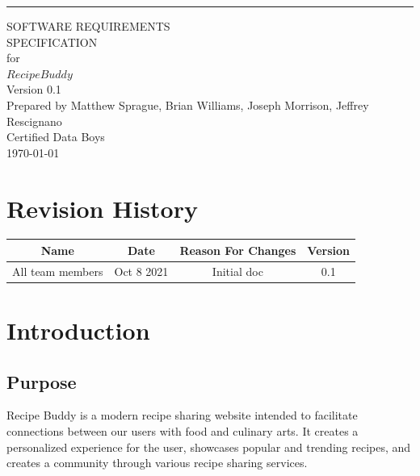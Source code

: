 \documentclass{scrreprt}
\def\myversion{0.1}
\begin{document}
\begin{flushright}
    \rule{16cm}{5pt}\vskip1cm
    \begin{bfseries}
        \Huge{SOFTWARE REQUIREMENTS\\ SPECIFICATION}\\
        \vspace{1.85cm}
        for\\
        \vspace{1.85cm}
        $Recipe Buddy$\\
        \vspace{1.8cm}
        \LARGE{Version \myversion}\\
        \vspace{1.8cm}
        Prepared by $ $Matthew Sprague, Brian Williams, Joseph Morrison, Jeffrey Rescignano$ $\\
        \vspace{1.8cm}
        $ $Certified Data Boys$ $\\
        \vspace{1.8cm}
        \today\\
    \end{bfseries}
\end{flushright}

\tableofcontents

\chapter*{Revision History}\label{revisions}

\begin{center}
    \begin{tabular}{c c c c}
        \midrule
        Name             & Date       & Reason For Changes & Version \\
        \midrule
        All team members & Oct 8 2021 & Initial doc        & 0.1     \\
        \midrule
    \end{tabular}
\end{center}

\chapter{Introduction}

\section{Purpose}
$ $Recipe Buddy is a modern recipe sharing website intended to facilitate connections between our users with food and culinary arts.
It creates a personalized experience for the user, showcases popular and trending recipes, and creates a community through various recipe sharing services.$ $
\end{document}
